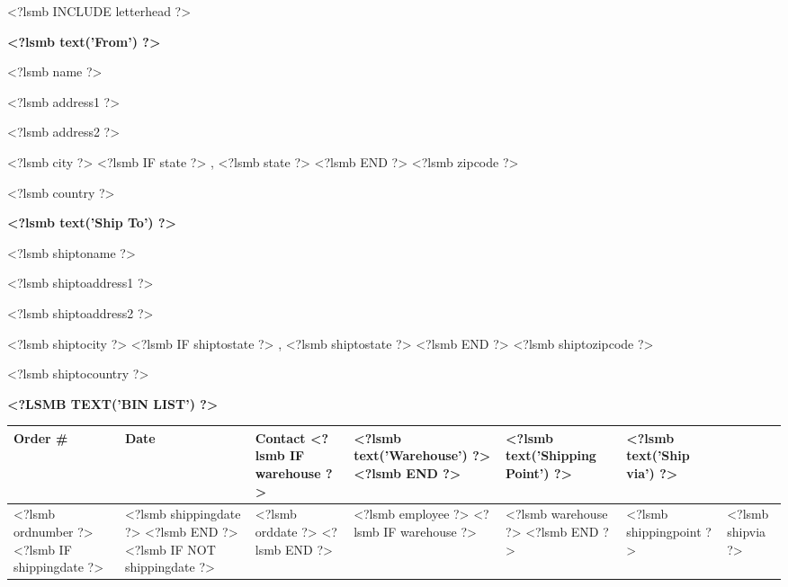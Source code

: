 \documentclass{scrartcl}
\begin{document}
\pagestyle{myheadings}
\thispagestyle{empty}

\fontsize{10pt}{12pt}\selectfont

<?lsmb INCLUDE letterhead ?>


%
%
%


\vspace*{0.5cm}

\parbox[t]{.5\textwidth}{
\textbf{<?lsmb text('From') ?>}
\vspace{0.3cm}

<?lsmb name ?>

<?lsmb address1 ?>

<?lsmb address2 ?>

<?lsmb city ?>
<?lsmb IF state ?>
\hspace{-0.1cm}, <?lsmb state ?>
<?lsmb END ?>
<?lsmb zipcode ?>

<?lsmb country ?>
}
\parbox[t]{.5\textwidth}{
\textbf{<?lsmb text('Ship To') ?>}
\vspace{0.3cm}

<?lsmb shiptoname ?>

<?lsmb shiptoaddress1 ?>

<?lsmb shiptoaddress2 ?>

<?lsmb shiptocity ?>
<?lsmb IF shiptostate ?>
\hspace{-0.1cm}, <?lsmb shiptostate ?>
<?lsmb END ?>
<?lsmb shiptozipcode ?>

<?lsmb shiptocountry ?>
}
\hfill

\vspace{1cm}

\textbf{\MakeUppercase{<?lsmb text('Bin List') ?>}}
\hfill

\vspace{1cm}

\begin{tabularx}{\textwidth}{*{6}{|X}|} \hline
  \textbf{Order \#} & \textbf{Date} & \textbf{Contact}
  <?lsmb IF warehouse ?>
  & \textbf{<?lsmb text('Warehouse') ?>}
  <?lsmb END ?>
  & \textbf{<?lsmb text('Shipping Point') ?>} & \textbf{<?lsmb text('Ship via') ?>} \\ [0.5em]
  \hline

  <?lsmb ordnumber ?>
  <?lsmb IF shippingdate ?>
  & <?lsmb shippingdate ?>
  <?lsmb END ?>
  <?lsmb IF NOT shippingdate ?>
  & <?lsmb orddate ?>
  <?lsmb END ?>
  & <?lsmb employee ?>
  <?lsmb IF warehouse ?>
  & <?lsmb warehouse ?>
  <?lsmb END ?>
  & <?lsmb shippingpoint ?> & <?lsmb shipvia ?> \\
  \hline
\end{tabularx}
\end{document}
